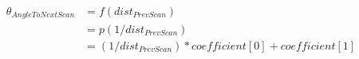 \begin{equation}
\begin{split}
\theta_{Angle To Next Scan} & = f(dist_{PrevScan}) \\
 & = p(1/dist_{PrevScan}) \\
 & = (1/dist_{PrevScan}) * coefficient[0] + coefficient[1]
\end{split}
\end{equation}